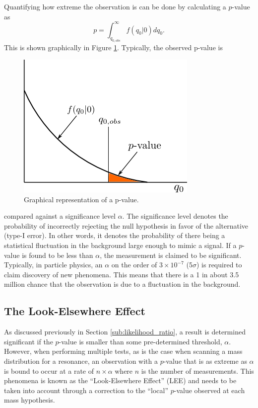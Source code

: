 Quantifying how extreme the observation is can be done by calculating a $p$-value as
\begin{equation}
    p = \int_{q_{0,obs}}^{\infty} f(q_{0} | 0) dq_{0}.
\end{equation} 
This is shown graphically in Figure \ref{fig:p_value}.  Typically, the observed 
p-value is
\begin{figure}[t]
    \centering
    \includegraphics[width=.5\textwidth]{images/p_value.png}
    \caption{Graphical representation of a p-value.}
    \label{fig:p_value}
\end{figure}
compared against a significance level $\alpha$.  The significance level denotes
the probability of incorrectly rejecting the null hypothesis in favor of the 
alternative (type-I error).  In other words, it denotes the probability of there
being a statistical fluctuation in the background large enough to mimic a signal.  
If a $p$-value is 
found to be less than $\alpha$, the measurement is claimed to be significant. 
Typically, in particle 
physics, an $\alpha$ on the order of $3 \times 10^{-7}$ (5$\sigma$) is required
to claim discovery of new phenomena.  This means that there is a 1 in 
about 3.5 million chance that the observation is due to a fluctuation in the background.

\subsection{The Look-Elsewhere Effect}

As discussed previously in Section \ref{sub:likelihood_ratio}, a result is 
determined significant if the $p$-value is smaller than some pre-determined
threshold, $\alpha$.  However, 
when performing multiple tests, as is the case when scanning a mass distribution
for a resonance, an observation with a $p$-value that is as extreme as $\alpha$
is bound to occur at a rate of $n\times\alpha$ where $n$ is the number of measurements.
This phenomena is known as the ``Look-Elsewhere Effect'' (LEE)
and needs to be taken into account through a correction to the ``local'' $p$-value
observed at each mass hypothesis.

